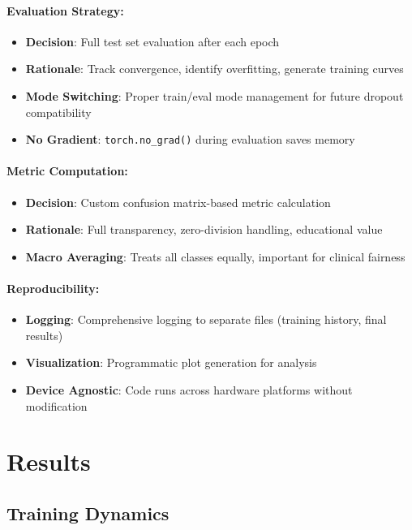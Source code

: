\documentclass[runningheads]{llncs}
\begin{document}
\paragraph{Evaluation Strategy:}
\begin{itemize}
    \item \textbf{Decision}: Full test set evaluation after each epoch
    \item \textbf{Rationale}: Track convergence, identify overfitting, generate training curves
    \item \textbf{Mode Switching}: Proper train/eval mode management for future dropout compatibility
    \item \textbf{No Gradient}: \texttt{torch.no\_grad()} during evaluation saves memory
\end{itemize}

\paragraph{Metric Computation:}
\begin{itemize}
    \item \textbf{Decision}: Custom confusion matrix-based metric calculation
    \item \textbf{Rationale}: Full transparency, zero-division handling, educational value
    \item \textbf{Macro Averaging}: Treats all classes equally, important for clinical fairness
\end{itemize}

\paragraph{Reproducibility:}
\begin{itemize}
    \item \textbf{Logging}: Comprehensive logging to separate files (training history, final results)
    \item \textbf{Visualization}: Programmatic plot generation for analysis
    \item \textbf{Device Agnostic}: Code runs across hardware platforms without modification
\end{itemize}

\section{Results}

\subsection{Training Dynamics}
\end{document}
